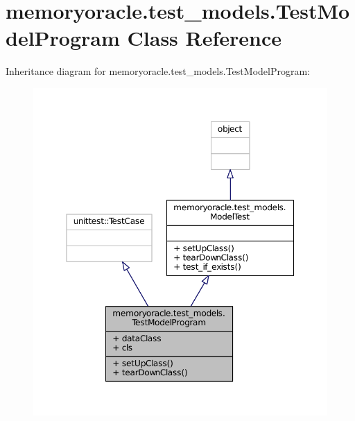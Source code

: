 \hypertarget{classmemoryoracle_1_1test__models_1_1TestModelProgram}{}\section{memoryoracle.\+test\+\_\+models.\+Test\+Model\+Program Class Reference}
\label{classmemoryoracle_1_1test__models_1_1TestModelProgram}


Inheritance diagram for memoryoracle.\+test\+\_\+models.\+Test\+Model\+Program\+:\nopagebreak
\begin{figure}[H]
\begin{center}
\leavevmode
\includegraphics[width=350pt]{classmemoryoracle_1_1test__models_1_1TestModelProgram__inherit__graph}
\end{center}
\end{figure}



